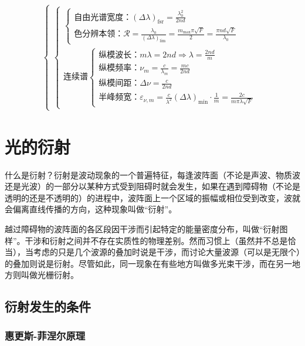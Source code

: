 \documentclass[UTF8]{report}
\theoremstyle{MyLineTheoremStyle} %
\theoremstyle{MyBlockTheoremStyle} %
\theoremstyle{MySubsubsectionStyle} %
\begin{document}
\begin{align*}
\begin{cases}
\begin{cases}
\begin{cases}
                        \text{自由光谱宽度：}\left(\Delta \lambda\right)_{\text{fsr}} =\frac{\lambda_0^2}{2nd} \\ 
                        \text{色分辨本领：}\mathscr{R} = \frac{\lambda_0}{\left(\Delta \lambda\right)_{\lim}} = \frac{m_{\max}\pi \sqrt{F}}{2} = \frac{\pi n d \sqrt{F}}{\lambda_0}
                    \end{cases}
                \\\text{连续谱}
                \begin{cases}
                    \text{纵模波长：} m\lambda = 2nd \Longrightarrow \lambda = \frac{2nd}{m} \\ 
                    \text{纵模频率：}\nu_m = \frac{c}{\lambda_m} = \frac{mc}{2nd} \\ 
                    \text{纵模间距：}\Delta \nu = \frac{c}{2nd} \\ 
                    \text{半峰频宽：}\varepsilon_{\nu, m} = \frac{c}{\lambda^2}\left(\Delta \lambda\right)_{\min} \cdot \frac{1}{m}  = \frac{2c}{m \pi \lambda \sqrt{F}}
                \end{cases}
            \end{cases}
    \end{cases}
\end{align*}

\chapter{光的衍射}\thispagestyle{fancy}

什么是衍射？衍射是波动现象的一个普遍特征，每逢波阵面（不论是声波、物质波还是光波）的一部分以某种方式受到阻碍时就会发生，如果在遇到障碍物（不论是透明的还是不透明的）的进程中，波阵面上一个区域的振幅或相位受到改变，波就会偏离直线传播的方向，这种现象叫做“衍射”。

越过障碍物的波阵面的各区段因干涉而引起特定的能量密度分布，叫做“衍射图样”。干涉和衍射之间并不存在实质性的物理差别。然而习惯上（虽然并不总是恰当），当考虑的只是几个波源的叠加时说是干涉，而讨论大量波源（可以是无限个）的叠加则说是衍射。尽管如此，同一现象在有些地方叫做多光束干涉，而在另一地方则叫做光栅衍射。

\section{衍射发生的条件}

\subsection{惠更斯-菲涅尔原理}
\end{document}
